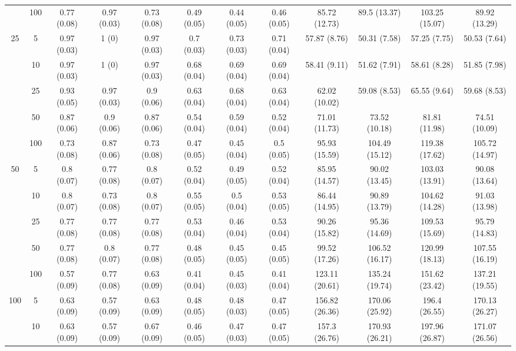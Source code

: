\documentclass[11pt,3p,review,authoryear]{elsarticle}
\theoremstyle{definition}
\begin{document}
\begin{landscape}
\begin{table}[b]
\begin{center}
{\begin{tabular}{cc|ccc|ccc|cccc|}
  & 100  & 0.77 (0.08) & 0.97 (0.03) & 0.73 (0.08) & 0.49 (0.05) & 0.44 (0.05) & 0.46 (0.05) & 85.72 (12.73) & 89.5 (13.37) & 103.25 (15.07) & 89.92 (13.29)\\[.3cm] 
 \multirow{5}{*}{25} & 5  & 0.97 (0.03) & 1 (0) & 0.97 (0.03) & 0.7 (0.03) & 0.73 (0.03) & 0.71 (0.04) & 57.87 (8.76) & 50.31 (7.58) & 57.25 (7.75) & 50.53 (7.64) \\ 
  & 10  & 0.97 (0.03) & 1 (0) & 0.97 (0.03) & 0.68 (0.04) & 0.69 (0.04) & 0.69 (0.04) & 58.41 (9.11) & 51.62 (7.91) & 58.61 (8.28) & 51.85 (7.98) \\ 
  & 25  & 0.93 (0.05) & 0.97 (0.03) & 0.9 (0.06) & 0.63 (0.04) & 0.68 (0.04) & 0.63 (0.04) & 62.02 (10.02) & 59.08 (8.53) & 65.55 (9.64) & 59.68 (8.53) \\ 
  & 50  & 0.87 (0.06) & 0.9 (0.06) & 0.87 (0.06) & 0.54 (0.04) & 0.59 (0.04) & 0.52 (0.04) & 71.01 (11.73) & 73.52 (10.18) & 81.81 (11.98) & 74.51 (10.09) \\ 
  & 100  & 0.73 (0.08) & 0.87 (0.06) & 0.73 (0.08) & 0.47 (0.05) & 0.45 (0.04) & 0.5 (0.05) & 95.93 (15.59) & 104.49 (15.12) & 119.38 (17.62) & 105.72 (14.97) \\[.3cm] 
 \multirow{5}{*}{50} & 5  & 0.8 (0.07) & 0.77 (0.08) & 0.8 (0.07) & 0.52 (0.04) & 0.49 (0.05) & 0.52 (0.04) & 85.95 (14.57) & 90.02 (13.45) & 103.03 (13.91) & 90.08 (13.64) \\ 
  & 10  & 0.8 (0.07) & 0.73 (0.08) & 0.8 (0.07) & 0.55 (0.05) & 0.5 (0.04) & 0.53 (0.05) & 86.44 (14.95) & 90.89 (13.79) & 104.62 (14.28) & 91.03 (13.98) \\ 
  & 25  & 0.77 (0.08) & 0.77 (0.08) & 0.77 (0.08) & 0.53 (0.04) & 0.46 (0.04) & 0.53 (0.04) & 90.26 (15.82) & 95.36 (14.69) & 109.53 (15.69) & 95.79 (14.83) \\ 
  & 50  & 0.77 (0.08) & 0.8 (0.07) & 0.77 (0.08) & 0.48 (0.05) & 0.45 (0.05) & 0.45 (0.05) & 99.52 (17.26) & 106.52 (16.17) & 120.99 (18.13) & 107.55 (16.19) \\ 
  & 100  & 0.57 (0.09) & 0.77 (0.08) & 0.63 (0.09) & 0.41 (0.04) & 0.45 (0.03) & 0.41 (0.04) & 123.11 (20.61) & 135.24 (19.74) & 151.62 (23.42) & 137.21 (19.55) \\[.3cm] 
 \multirow{5}{*}{100} & 5  & 0.63 (0.09) & 0.57 (0.09) & 0.63 (0.09) & 0.48 (0.05) & 0.48 (0.03) & 0.47 (0.05) & 156.82 (26.36) & 170.06 (25.92) & 196.4 (26.55) & 170.13 (26.27) \\ 
  & 10  & 0.63 (0.09) & 0.57 (0.09) & 0.67 (0.09) & 0.46 (0.05) & 0.47 (0.03) & 0.47 (0.05) & 157.3 (26.76) & 170.93 (26.21) & 197.96 (26.87) & 171.07 (26.56) \\ 

\end{tabular}}
\end{center}
\end{table}
\end{landscape}
\end{document}
